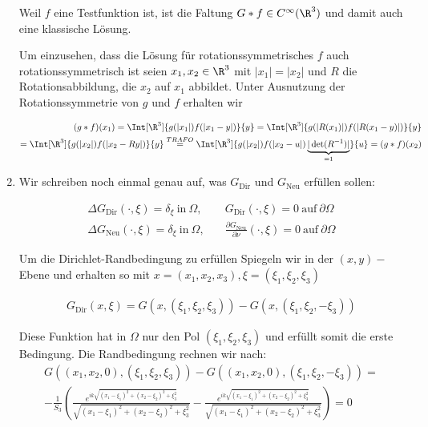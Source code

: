 \begin{solution}
\begin{enumerate}[label = (\roman*)]
Weil $f$ eine Testfunktion ist, ist die Faltung $G \ast f \in C^{\infty}(\R^3)$ und damit auch eine klassische Lösung.

Um einzusehen, dass die Lösung für rotationssymmetrisches $f$ auch rotationssymmetrisch ist seien $x_1, x_2 \in \R^3$ mit
$|x_1| = |x_2|$ und $R$ die Rotationsabbildung, die $x_2$ auf $x_1$ abbildet.
Unter Ausnutzung der Rotationssymmetrie von $g$ und $f$ erhalten wir

\begin{align*}
  (g \ast f)(x_1)
  =
  \Int[\R^3]{g(|x_1|) f(|x_1 - y|)}{y}
  = \Int[\R^3]{g(|R(x_1)|) f(|R(x_1 - y)|)}{y} \\
  =
  \Int[\R^3]{g(|x_2|) f(|x_2 - Ry|) }{y}
  \stackrel{TRAFO}{=} \Int[\R^3]{g(|x_2|) f(|x_2 - u|) \underbrace{|\det(R^{-1})|}_{=1}}{u} =
  (g \ast f)(x_2)
\end{align*}

\item Wir schreiben noch einmal genau auf, was $G_{\mathrm{Dir}}$ und $G_{\mathrm{Neu}}$ erfüllen sollen:

\begin{align*}
  \Delta G_\mathrm{Dir}(\cdot, \xi) = \delta_\xi ~\text{in}~ \Omega,&
  \quad
  G_\mathrm{Dir}(\cdot, \xi) = 0 ~\text{auf}~ \partial \Omega \\
  \Delta G_\mathrm{Neu}(\cdot, \xi) = \delta_\xi ~\text{in}~ \Omega,&
  \quad
  \frac{\partial G_\mathrm{Neu}}{\partial \nu}(\cdot, \xi) = 0 ~\text{auf}~ \partial \Omega
\end{align*}

Um die Dirichlet-Randbedingung zu erfüllen Spiegeln wir in der $(x,y)-$Ebene und erhalten so mit $x = (x_1,x_2,x_3), \xi = (\xi_1, \xi_2, \xi_3)$

\begin{align*}
  G_\mathrm{Dir}(x,\xi) = G(x,(\xi_1, \xi_2, \xi_3)) - G(x,(\xi_1,\xi_2, -\xi_3))
\end{align*}

Diese Funktion hat in $\Omega$ nur den Pol $(\xi_1, \xi_2, \xi_3)$ und erfüllt somit die erste Bedingung. Die Randbedingung rechnen wir nach:
\begin{align*}
  G((x_1,x_2,0),(\xi_1, \xi_2, \xi_3)) - G((x_1,x_2,0),(\xi_1,\xi_2, -\xi_3))
  = \\
  -\frac{1}{S_3}\left(\frac{e^{ik\sqrt{(x_1 - \xi_1)^2 + (x_2 - \xi_2)^2 + \xi_3^2 }}}{\sqrt{(x_1 - \xi_1)^2 + (x_2 - \xi_2)^2 + \xi_3^2 }}
    -\frac{e^{ik\sqrt{(x_1 - \xi_1)^2 + (x_2 - \xi_2)^2 + \xi_3^2 }}}{\sqrt{(x_1 - \xi_1)^2 + (x_2 - \xi_2)^2 + \xi_3^2 }}\right)
  =
  0
\end{align*}


\end{enumerate}
\end{solution}
